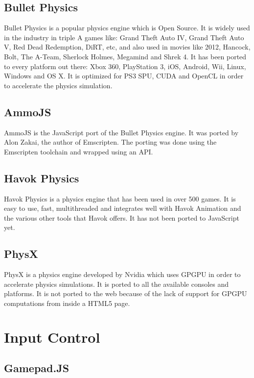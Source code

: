 \subsection{Bullet Physics}

Bullet Physics is a popular physics engine which is Open Source. It is widely used in the industry in triple A games like: Grand Theft Auto IV, Grand Theft Auto V, Red Dead Redemption, DiRT, etc, and also used in movies like 2012, Hancock, Bolt, The A-Team, Sherlock Holmes, Megamind and Shrek 4. It has been ported to every platform out there: Xbox 360, PlayStation 3, iOS, Android, Wii, Linux, Windows and OS X. It is optimized for PS3 SPU, CUDA and OpenCL in order to accelerate the physics simulation.

\subsection{AmmoJS}

AmmoJS is the JavaScript port of the Bullet Physics engine. It was ported by Alon Zakai, the author of Emscripten. The porting was done using the Emscripten toolchain and wrapped using an API.

\subsection{ Havok Physics}

Havok Physics is a physics engine that has been used in over 500 games. It is easy to use, fast, multithreaded and integrates well with Havok Animation and the various other tools that Havok offers. It has not been ported to JavaScript yet. 

\subsection{PhysX}

PhysX is a physics engine developed by Nvidia which uses GPGPU in order to accelerate physics simulations. It is ported to all the available consoles and platforms. It is not ported to the web because of the lack of support for GPGPU computations from inside a HTML5 page.

\section{Input Control}

\subsection{Gamepad.JS}

